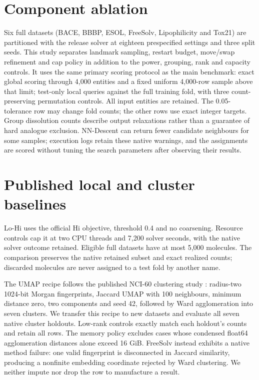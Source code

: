 \section{Component ablation}

Six full datasets (BACE, BBBP, ESOL, FreeSolv, Lipophilicity and Tox21) are
partitioned with the release solver at eighteen prespecified settings and
three split seeds. This study separates landmark sampling, restart budget,
move/swap refinement and cap policy in addition to the power, grouping, rank
and capacity controls. It uses the same primary scoring protocol as the main
benchmark: exact global scoring through 4,000 entities and a fixed uniform
4,000-row sample above that limit; test-only local queries against the full
training fold, with three count-preserving permutation controls. All input
entities are retained. The 0.05-tolerance row may change fold counts; the other
rows use exact integer targets. Group dissolution counts describe output
relaxations rather than a guarantee of hard analogue exclusion. NN-Descent
can return fewer candidate neighbours for some samples; execution logs retain
these native warnings, and the assignments are scored without tuning the
search parameters after observing their results.

\clearpage

\section{Published local and cluster baselines}

Lo-Hi uses the official Hi objective, threshold 0.4 and no coarsening. Resource
controls cap it at two CPU threads and 7,200 solver seconds, with the native
solver outcome retained. Eligible full datasets have at most 5,000 molecules.
The comparison preserves the native retained subset and exact realized counts;
discarded molecules are never assigned to a test fold by another name.

The UMAP recipe follows the published NCI-60 clustering study
\citep{hernandez2023clustering}: radius-two 1024-bit Morgan fingerprints,
Jaccard UMAP with 100 neighbours, minimum distance zero, two components and
seed 42, followed by Ward agglomeration into seven clusters. We transfer this
recipe to new datasets and evaluate all seven native cluster holdouts.
Low-rank controls exactly match each holdout's counts and retain all rows.
The memory policy excludes cases whose condensed float64 agglomeration
distances alone exceed 16 GiB. FreeSolv instead exhibits a native method
failure: one valid fingerprint is disconnected in Jaccard similarity, producing
a nonfinite embedding coordinate rejected by Ward clustering. We neither impute
nor drop the row to manufacture a result.

